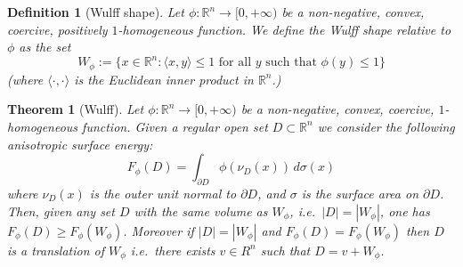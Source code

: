 \documentclass[12pt]{article}
\newcommand{\R}{\mathbb R}
\newtheorem{theorem}{Theorem}
\newtheorem{definition}{Definition}
\theoremstyle{remark}
\begin{document}
\begin{definition}[Wulff shape]
Let $\phi\colon\R^n \to [0,+\infty)$ be a non-negative, convex, coercive, positively $1$-homogeneous function. We define the \emph{Wulff shape} relative to $\phi$ as the set
\[
  W_\phi := \{ x \in \R^n \colon \text{$\langle x,y\rangle \le 1$ for all $y$ such that $\phi(y)\le 1$}\} 
\]
(where $\langle \cdot,\cdot\rangle$ is the Euclidean inner product in $\R^n$.)
\end{definition}

\begin{theorem}[Wulff]
Let $\phi\colon\R^n \to [0,+\infty)$ be a non-negative, convex, coercive, $1$-homogeneous function. Given a regular open set $D\subset\R^n$ we consider the following anisotropic surface energy:
\[
  F_\phi(D) = \int_{\partial D} \phi(\nu_D(x))\, d\sigma(x)
\]
where $\nu_D(x)$ is the outer unit normal to $\partial D$, and $\sigma$ is the surface area on $\partial D$.
Then, given any set $D$ with the same volume as $W_\phi$, i.e.\ $|D|=|W_\phi|$, one has $F_\phi(D)\ge F_\phi(W_\phi)$.
Moreover if $|D|=|W_\phi|$ and $F_\phi(D)=F_\phi(W_\phi)$ then $D$ is a translation of $W_\phi$ i.e.\ there exists $v\in R^n$ such that $D=v+W_\phi$.
\end{theorem}
\end{document}
